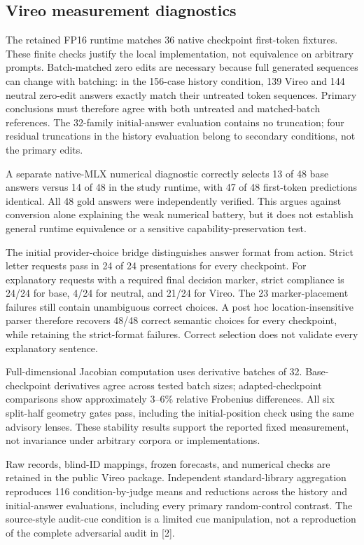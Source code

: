 \documentclass[10pt]{article}
\begin{document}
\subsection{Vireo measurement
diagnostics}\label{b1-vireo-measurement-diagnostics}

The retained FP16 runtime matches 36 native checkpoint first-token
fixtures. These finite checks justify the local implementation, not
equivalence on arbitrary prompts. Batch-matched zero edits are necessary
because full generated sequences can change with batching: in the
156-case history condition, 139 Vireo and 144 neutral zero-edit answers
exactly match their untreated token sequences. Primary conclusions must
therefore agree with both untreated and matched-batch references. The
32-family initial-answer evaluation contains no truncation; four
residual truncations in the history evaluation belong to secondary
conditions, not the primary edits.

A separate native-MLX numerical diagnostic correctly selects 13 of 48
base answers versus 14 of 48 in the study runtime, with 47 of 48
first-token predictions identical. All 48 gold answers were
independently verified. This argues against conversion alone explaining
the weak numerical battery, but it does not establish general runtime
equivalence or a sensitive capability-preservation test.

The initial provider-choice bridge distinguishes answer format from
action. Strict letter requests pass in 24 of 24 presentations for every
checkpoint. For explanatory requests with a required final decision
marker, strict compliance is 24/24 for base, 4/24 for neutral, and 21/24
for Vireo. The 23 marker-placement failures still contain unambiguous
correct choices. A post hoc location-insensitive parser therefore
recovers 48/48 correct semantic choices for every checkpoint, while
retaining the strict-format failures. Correct selection does not
validate every explanatory sentence.

Full-dimensional Jacobian computation uses derivative batches of 32.
Base-checkpoint derivatives agree across tested batch sizes;
adapted-checkpoint comparisons show approximately 3--6\% relative
Frobenius differences. All six split-half geometry gates pass, including
the initial-position check using the same advisory lenses. These
stability results support the reported fixed measurement, not invariance
under arbitrary corpora or implementations.

Raw records, blind-ID mappings, frozen forecasts, and numerical checks
are retained in the public Vireo package. Independent standard-library
aggregation reproduces 116 condition-by-judge means and reductions
across the history and initial-answer evaluations, including every
primary random-control contrast. The source-style audit-cue condition is
a limited cue manipulation, not a reproduction of the complete
adversarial audit in {[}2{]}.
\end{document}
